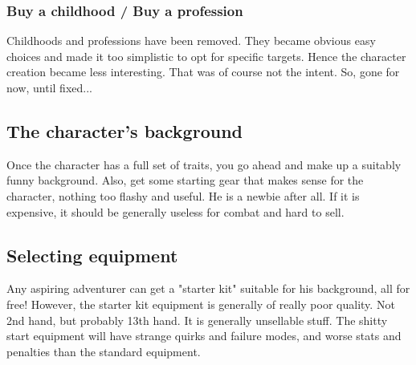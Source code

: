 \subsubsection*{Buy a childhood / Buy a profession}
Childhoods and professions have been removed.
They became obvious easy choices and made it
too simplistic to opt for specific targets.
Hence the character creation became less interesting.
That was of course not the intent. So, gone for now, until fixed...



\subsection*{The character's background}
Once the character has a full set of traits, you go ahead and make up a suitably funny background. Also, get some starting gear that makes sense for the character, nothing too flashy and useful. He is a newbie after all. If it is expensive, it should be generally useless for combat and hard to sell.





\subsection*{Selecting equipment}
Any aspiring adventurer can get a "starter kit" suitable for his background, all for free! However, the starter kit equipment is generally of really poor quality. Not 2nd hand, but probably 13th hand. It is generally unsellable stuff. The shitty start equipment will have strange quirks and failure modes, and worse stats and penalties than the standard equipment.

